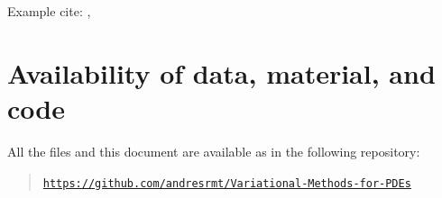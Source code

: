 \documentclass[a4paper,doc,11pt]{article}
\begin{document}
\vspace{2\baselineskip}

Example cite:
\citet{Brezis2010}, \citep{Brezis2010}







\section*{Availability of data, material, and code}
{

All the files and this document are available as in the following repository:
\begin{quote}
    \noindent \href{https://github.com/andresrmt/Variational-Methods-for-PDEs}{\texttt{https://github.com/andresrmt/Variational-Methods-for-PDEs}}
\end{quote}



}

\newpage



\end{document}

